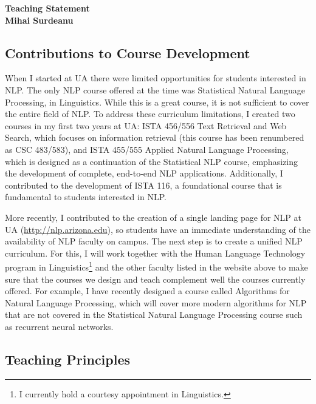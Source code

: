 \documentclass[10pt]{article}
\begin{document}

\begin{center}
{\Large \bf Teaching Statement\\
\smallskip
{\large \bf Mihai Surdeanu}}
\end{center}

\subsection*{Contributions to Course Development}

When I started at UA there were limited opportunities for students interested in NLP. The only NLP course offered at the time was Statistical Natural Language Processing, in Linguistics. While this is a great course, it is not sufficient to cover the entire field of NLP. 
To address these curriculum limitations, I created two courses in my first two years at UA: ISTA 456/556 Text Retrieval and Web Search, which focuses on information retrieval (this course has been renumbered as CSC 483/583), and ISTA 455/555 Applied Natural Language Processing, which is designed as a continuation of the Statistical NLP course, emphasizing the development of complete, end-to-end NLP applications.  Additionally, I contributed to the development of ISTA 116, a foundational course that is fundamental to students interested in NLP.

More recently, I contributed to the creation of a single landing page for NLP at UA (\url{http://nlp.arizona.edu}), so students have an immediate understanding of the availability of NLP faculty on campus. The next step is to create a unified NLP curriculum. For this, I will work together with the Human Language Technology program in Linguistics\footnote{I currently hold a courtesy appointment in Linguistics.} and the other faculty listed in the website above to make sure that the courses we design and teach complement well the courses currently offered. For example, I have recently designed a course called Algorithms for Natural Language Processing, which will cover more modern algorithms for NLP that are not covered in the Statistical Natural Language Processing course such as recurrent neural networks.

\subsection*{Teaching Principles}
\end{document}
